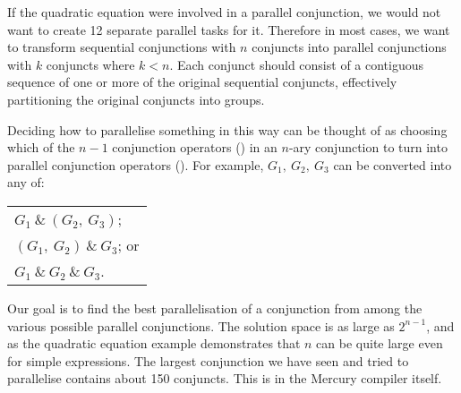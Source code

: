 \noindent
If the quadratic equation were involved in a parallel conjunction,
we would not want to create 12 separate parallel tasks for it.
Therefore in most cases,
we want to transform sequential conjunctions with $n$ conjuncts into
parallel conjunctions with $k$ conjuncts where $k < n$.
Each conjunct should consist of a contiguous sequence
of one or more of the original sequential conjuncts,
effectively partitioning the original conjuncts into groups.

Deciding how to parallelise something in this way can be thought of as
choosing which of the $n-1$ conjunction operators (\samp{,}) in an $n$-ary
conjunction to turn into parallel conjunction operators (\samp{\&}).
For example, $G_1,~G_2,~G_3$ can be converted
into any of:

\begin{tabular}{l}
$G_1~\&~(G_2,~G_3)$; \\
$(G_1,~G_2)~\&~G_3$; or \\
$G_1~\&~G_2~\&~G_3$.
\end{tabular}

%

\noindent
Our goal is to find the best parallelisation of a conjunction from among
the various possible parallel conjunctions.
The solution space is as large as $2^{n-1}$,
and as the quadratic equation example demonstrates that $n$ can be quite
large even for simple expressions.
The largest conjunction we have seen and tried to parallelise contains about 150
conjuncts.
This is in the Mercury compiler itself.

